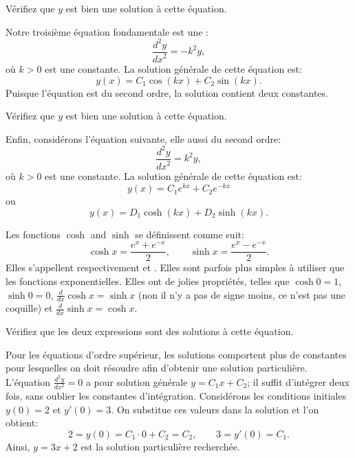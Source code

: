 \begin{exercise}
	Vérifiez que $y$ est bien une solution à cette équation.
\end{exercise}

Notre troisième équation fondamentale est une
\emph{}:
\begin{equation*}
	\frac{d^2y}{{dx}^2} = -k^2 y,
\end{equation*}
où $k > 0$ est une constante. La solution générale de cette équation est:
\begin{equation*}
	y(x) = C_1 \cos(kx) + C_2 \sin(kx).
\end{equation*}
Puisque l'équation est du second ordre, la solution contient deux constantes.

\begin{exercise}
	Vérifiez que $y$ est bien une solution à cette équation.
\end{exercise}

Enfin, considérons l'équation suivante, elle aussi du second ordre:
\begin{equation*}
	\frac{d^2y}{{dx}^2} = k^2 y,
\end{equation*}
où $k > 0$ est une constante. La solution générale de cette équation est:
\begin{equation*}
	y(x) = C_1 e^{kx} + C_2 e^{-kx}
\end{equation*}
ou
\begin{equation*}
	y(x) = D_1 \cosh(kx) + D_2 \sinh(kx) .
\end{equation*}

Les fonctions $\cosh$ and $\sinh$ se définissent comme suit:
\begin{equation*}
	\cosh x = \frac{e^{x} + e^{-x}}{2} , \qquad
	\sinh x = \frac{e^{x} - e^{-x}}{2} .
\end{equation*}
Elles s'appellent respectivement \emph{}
et \emph{}.
Elles sont parfois plus simples à utiliser que les fonctions exponentielles.  Elles ont de jolies propriétés, telles que
$\cosh 0 = 1$, $\sinh 0 = 0$, $\frac{d}{dx} \cosh x = \sinh x$
(non il n'y a pas de signe moins, ce n'est pas une coquille)
et $\frac{d}{dx} \sinh x = \cosh x$.

\begin{exercise}
	Vérifiez que les deux expressions sont des solutions à cette équation.
\end{exercise}

\begin{example}
	Pour les équations d'ordre supérieur, les solutions comportent plus de constantes pour lesquelles
	on doit résoudre afin d'obtenir une solution particulière.
	L'équation  $\frac{d^2y}{dx^2} = 0$ a pour solution générale $y = C_1 x + C_2$;
	il suffit d'intégrer deux fois, sans oublier les constantes d'intégration.
	Considérons les conditions initiales $y(0) = 2$ et $y'(0) = 3$.
	On substitue ces valeurs dans la solution et l'on obtient:
	\begin{equation*}
		2 = y(0) = C_1 \cdot 0 + C_2 = C_2, \qquad
		3 = y'(0) = C_1 .
	\end{equation*}
	Ainsi, $y = 3x + 2$ est la solution particulière recherchée.
\end{example}


